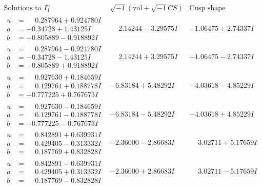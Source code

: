 \documentclass[1p]{elsarticle_modified}
\theoremstyle{definition}
\newcommand{\I}{\sqrt{-1}}
\begin{document}
$$\begin{array}{c|c|c}  
\text{Solutions to }I^u_{1}& \I (\text{vol} + \sqrt{-1}CS) & \text{Cusp shape}\\
 \hline 
\begin{aligned}
u &= \phantom{-}0.287964 + 0.924780 I \\
a &= -0.34728 + 1.43125 I \\
b &= -0.805889 - 0.918892 I\end{aligned}
 & \phantom{-}2.14244 - 3.29575 I & -1.06475 + 2.74337 I \\ \hline\begin{aligned}
u &= \phantom{-}0.287964 - 0.924780 I \\
a &= -0.34728 - 1.43125 I \\
b &= -0.805889 + 0.918892 I\end{aligned}
 & \phantom{-}2.14244 + 3.29575 I & -1.06475 - 2.74337 I \\ \hline\begin{aligned}
u &= \phantom{-}0.927630 + 0.184659 I \\
a &= \phantom{-}0.129761 + 0.188778 I \\
b &= -0.777225 + 0.767673 I\end{aligned}
 & -6.83184 + 5.48292 I & -4.03618 - 4.85229 I \\ \hline\begin{aligned}
u &= \phantom{-}0.927630 - 0.184659 I \\
a &= \phantom{-}0.129761 - 0.188778 I \\
b &= -0.777225 - 0.767673 I\end{aligned}
 & -6.83184 - 5.48292 I & -4.03618 + 4.85229 I \\ \hline\begin{aligned}
u &= \phantom{-}0.842891 + 0.639931 I \\
a &= \phantom{-}0.429405 - 0.313332 I \\
b &= \phantom{-}0.187769 + 0.832828 I\end{aligned}
 & -2.36000 - 2.86683 I & \phantom{-}3.02711 + 5.17659 I \\ \hline\begin{aligned}
u &= \phantom{-}0.842891 - 0.639931 I \\
a &= \phantom{-}0.429405 + 0.313332 I \\
b &= \phantom{-}0.187769 - 0.832828 I\end{aligned}
 & -2.36000 + 2.86683 I & \phantom{-}3.02711 - 5.17659 I \\ \hline\begin{aligned}

\end{aligned}
\end{array}$$
\end{document}
